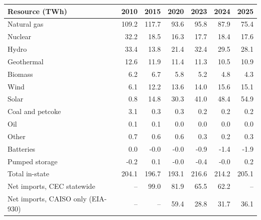 \begin{tabular}{lrrrrrr}
\toprule
Resource (TWh) & 2010 & 2015 & 2020 & 2023 & 2024 & 2025 \\
\midrule
Natural gas & 109.2 & 117.7 & 93.6 & 95.8 & 87.9 & 75.4 \\
Nuclear & 32.2 & 18.5 & 16.3 & 17.7 & 18.4 & 17.6 \\
Hydro & 33.4 & 13.8 & 21.4 & 32.4 & 29.5 & 28.1 \\
Geothermal & 12.6 & 11.9 & 11.4 & 11.3 & 10.5 & 10.9 \\
Biomass & 6.2 & 6.7 & 5.8 & 5.2 & 4.8 & 4.3 \\
Wind & 6.1 & 12.2 & 13.6 & 14.0 & 15.6 & 15.1 \\
Solar & 0.8 & 14.8 & 30.3 & 41.0 & 48.4 & 54.9 \\
Coal and petcoke & 3.1 & 0.3 & 0.3 & 0.2 & 0.2 & 0.2 \\
Oil & 0.1 & 0.1 & 0.0 & 0.0 & 0.0 & 0.0 \\
Other & 0.7 & 0.6 & 0.6 & 0.3 & 0.2 & 0.3 \\
Batteries & 0.0 & -0.0 & -0.0 & -0.9 & -1.4 & -1.9 \\
Pumped storage & -0.2 & 0.1 & -0.0 & -0.4 & -0.0 & 0.2 \\
\midrule
Total in-state & 204.1 & 196.7 & 193.1 & 216.6 & 214.2 & 205.1 \\
Net imports, CEC statewide & -- & 99.0 & 81.9 & 65.5 & 62.2 & -- \\
Net imports, CAISO only (EIA-930) & -- & -- & 59.4 & 28.8 & 31.7 & 36.1 \\
\bottomrule
\end{tabular}